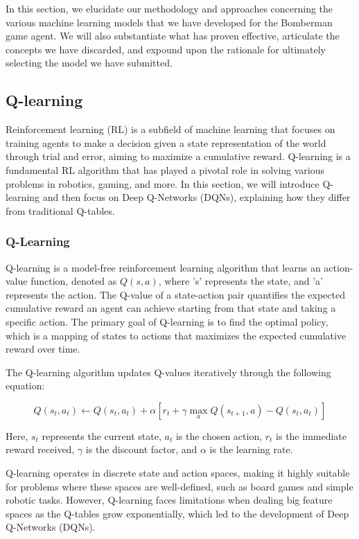 
In this section, we elucidate our methodology and approaches concerning the various machine learning models 
that we have developed for the Bomberman game agent. We will also substantiate what has proven effective, articulate 
the concepts we have discarded, and expound upon the rationale for ultimately selecting the model we have submitted.

\subsection{Q-learning}

Reinforcement learning (RL) is a subfield of machine learning that focuses on training agents to make a decision given a state representation of the world through trial and error, aiming to maximize a cumulative reward. Q-learning is a fundamental RL algorithm that has played a pivotal role in solving various problems in robotics, gaming, and more. In this section, we will introduce Q-learning and then focus on Deep Q-Networks (DQNs), explaining how they differ from traditional Q-tables.

\subsubsection{Q-Learning}

Q-learning is a model-free reinforcement learning algorithm that learns an action-value function, denoted as \(Q(s, a)\), where 's' represents the state, and 'a' represents the action. The Q-value of a state-action pair quantifies the expected cumulative reward an agent can achieve starting from that state and taking a specific action. The primary goal of Q-learning is to find the optimal policy, which is a mapping of states to actions that maximizes the expected cumulative reward over time.

The Q-learning algorithm updates Q-values iteratively through the following equation:

\begin{equation}
	Q(s_t, a_t) \leftarrow Q(s_t, a_t) + \alpha \left[ r_t + \gamma \max_a Q(s_{t+1}, a) - Q(s_t, a_t) \right]
\end{equation}

Here, \(s_t\) represents the current state, \(a_t\) is the chosen action, \(r_t\) is the immediate reward received, \(\gamma\) is the discount factor, and \(\alpha\) is the learning rate.

Q-learning operates in discrete state and action spaces, making it highly suitable for problems where these spaces are well-defined, such as board games and simple robotic tasks. However, Q-learning faces limitations when dealing big feature spaces as the Q-tables grow exponentially, which led to the development of Deep Q-Networks (DQNs).

